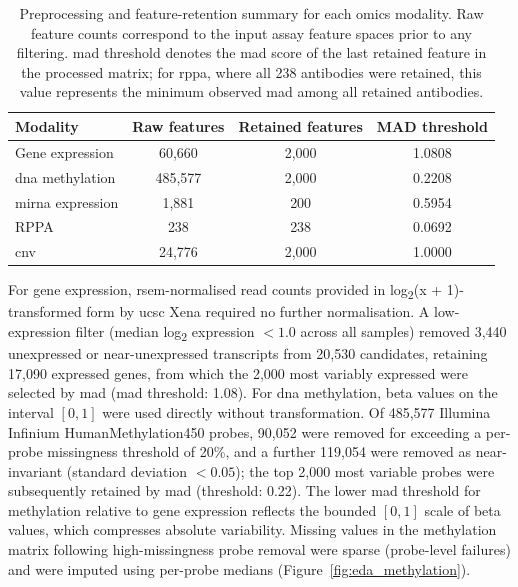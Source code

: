 \begin{table}[H]    
\footnotesize
\centering
\caption[Preprocessing and feature-retention summary]{Preprocessing and feature-retention summary for each omics modality. Raw feature counts correspond to the input assay feature spaces prior to any filtering. \gls{mad} threshold denotes the \gls{mad} score of the last retained feature in the processed matrix; for \gls{rppa}, where all 238 antibodies were retained, this value represents the minimum observed \gls{mad} among all retained antibodies.}
\begin{tabular}{lccc}
    \toprule
    \textbf{Modality} & \textbf{Raw features} & \textbf{Retained features} & \textbf{MAD threshold} \\
    \midrule
    Gene expression & 60,660 & 2,000 & 1.0808 \\
    \gls{dna} methylation & 485,577 & 2,000 & 0.2208 \\
    \gls{mirna} expression & 1,881 & 200 & 0.5954 \\
    RPPA & 238 & 238 & 0.0692 \\
    \gls{cnv} & 24,776 & 2,000 & 1.0000 \\
    \bottomrule
\end{tabular}
\label{tab:eda_preprocessing_summary}
\end{table}

For gene expression, \gls{rsem}-normalised read counts provided in log\textsubscript{2}(x + 1)-transformed form by \gls{ucsc} Xena required no further normalisation. A low-expression filter (median log\textsubscript{2} expression $< 1.0$ across all samples) removed 3,440 unexpressed or near-unexpressed transcripts from 20,530 candidates, retaining 17,090 expressed genes, from which the 2,000 most variably expressed were selected by \gls{mad} (\gls{mad} threshold: 1.08). For \gls{dna} methylation, beta values on the interval $[0, 1]$ were used directly without transformation. Of 485,577 Illumina Infinium HumanMethylation450 probes, 90,052 were removed for exceeding a per-probe missingness threshold of 20\%, and a further 119,054 were removed as near-invariant (standard deviation $< 0.05$); the top 2,000 most variable probes were subsequently retained by \gls{mad} (threshold: 0.22). The lower \gls{mad} threshold for methylation relative to gene expression reflects the bounded $[0,1]$ scale of beta values, which compresses absolute variability. Missing values in the methylation matrix following high-missingness probe removal were sparse (probe-level failures) and were imputed using per-probe medians (Figure~\ref{fig:eda_methylation}).

